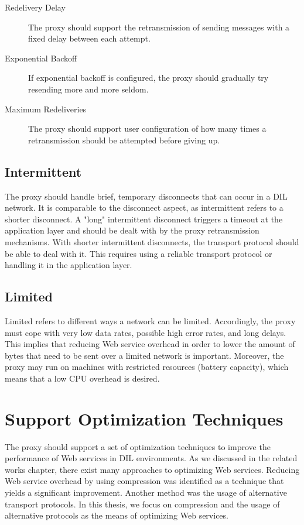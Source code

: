 \begin{description}

    \item[Redelivery Delay] The proxy should support the retransmission of
    sending messages with a fixed delay between each attempt.

    \item[Exponential Backoff] If exponential backoff is configured, the proxy
    should gradually try resending more and more seldom.

    \item[Maximum Redeliveries] The proxy should support user configuration of
    how many times a retransmission should be attempted before giving up.

\end{description}


\subsection{Intermittent}

The proxy should handle brief, temporary disconnects that can occur in a DIL
network. It is comparable to the disconnect aspect, as intermittent refers to a
shorter disconnect. A "long" intermittent disconnect triggers a timeout at the
application layer and should be dealt with by the proxy retransmission
mechanisms. With shorter intermittent disconnects, the transport protocol should
be able to deal with it. This requires using a reliable transport protocol or
handling it in the application layer.

\subsection{Limited}

Limited refers to different ways a network can be limited. Accordingly, the
proxy must cope with very low data rates, possible high error rates, and long
delays. This implies that reducing Web service overhead in order to lower the
amount of bytes that need to be sent over a limited network is important.
Moreover, the proxy may run on machines with restricted resources (battery
capacity), which means that a low CPU overhead is desired.

\section{Support Optimization Techniques}

The proxy should support a set of optimization techniques to improve the
performance of Web services in DIL environments. As we discussed in the related
works chapter, there exist many approaches to optimizing Web services. Reducing
Web service overhead by using compression was identified as a technique that
yields a significant improvement. Another method was the usage of alternative
transport protocols. In this thesis, we focus on compression and the usage of
alternative protocols as the means of optimizing Web services.

